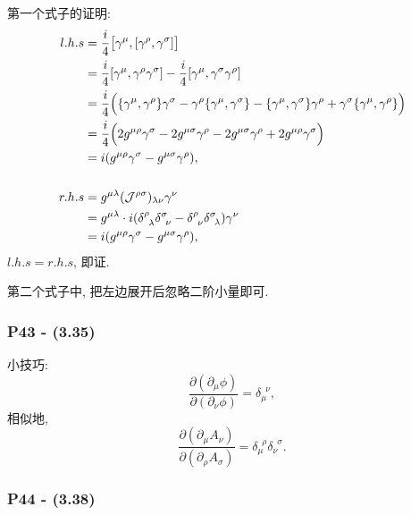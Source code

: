 \documentclass[cn,hazy,blue,11pt,device=normal,chinesefont=founder]{elegantnote}
\begin{document}
第一个式子的证明: 
\begin{equation}
  \begin{aligned}
    l.h.s &= \frac{i}{4}\bigl[\gamma^\mu, [\gamma^\rho, \gamma^\sigma]\bigr] \\
    &= \frac{i}{4}[\gamma^\mu, \gamma^\rho \gamma^\sigma] - \frac{i}{4}[\gamma^\mu, \gamma^\sigma \gamma^\rho] \\ 
    &= \frac{i}{4}\Bigl(\{\gamma^\mu, \gamma^\rho\}\gamma^\sigma - \gamma^\rho\{\gamma^\mu, \gamma^\sigma\} - \{\gamma^\mu, \gamma^\sigma\}\gamma^\rho + \gamma^\sigma\{\gamma^\mu, \gamma^\rho\}\Bigr) \\
    &= \frac{i}{4}\Bigl(2g^{\mu\rho}\gamma^\sigma - 2g^{\mu\sigma}\gamma^\rho - 2g^{\mu\sigma}\gamma^\rho + 2g^{\mu\rho}\gamma^\sigma \Bigr) \\
    &= i(g^{\mu\rho}\gamma^\sigma - g^{\mu\sigma}\gamma^\rho), \\
    \ \\
    r.h.s &= g^{\mu\lambda}(\mathcal{J}^{\rho\sigma})_{\lambda\nu} \gamma^\nu \\
    &= g^{\mu\lambda}\cdot i(\delta^\rho_{\phantom{1}\lambda} \delta^\sigma_{\phantom{1}\nu} - \delta^\rho_{\phantom{1}\nu} \delta^\sigma_{\phantom{1}\lambda}) \gamma^\nu \\ 
    &= i(g^{\mu\rho}\gamma^\sigma - g^{\mu\sigma}\gamma^\rho), 
  \end{aligned}
\end{equation}
$l.h.s = r.h.s$, 即证. 

第二个式子中, 把左边展开后忽略二阶小量即可. 

\subsubsection{P43 - (3.35)}

小技巧: 
\begin{equation}
  \frac{\partial (\partial_\mu \phi)}{\partial (\partial_\nu \phi)} = \delta_\mu^{\phantom{1}\nu}, 
\end{equation}
相似地, 
\begin{equation}
  \frac{\partial (\partial_\mu A_\nu)}{\partial (\partial_\rho A_\sigma)} = \delta_\mu^{\phantom{1}\rho}\delta_\nu^{\phantom{1}\sigma}.
\end{equation}

\subsubsection{P44 - (3.38)}
\end{document}
